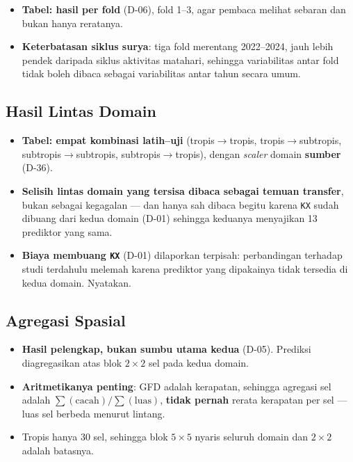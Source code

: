 \begin{itemize}
    \item \textbf{Tabel: hasil per fold} (D-06), fold 1--3, agar pembaca melihat
          sebaran dan bukan hanya reratanya.
    \item \textbf{Keterbatasan siklus surya}: tiga fold merentang 2022--2024,
          jauh lebih pendek daripada siklus aktivitas matahari, sehingga
          variabilitas antar fold tidak boleh dibaca sebagai variabilitas
          antar tahun secara umum.
\end{itemize}

\subsection{Hasil Lintas Domain}

\begin{itemize}
    \item \textbf{Tabel: empat kombinasi latih--uji} (tropis$\rightarrow$tropis,
          tropis$\rightarrow$subtropis, subtropis$\rightarrow$subtropis,
          subtropis$\rightarrow$tropis), dengan \textit{scaler} domain
          \textbf{sumber} (D-36).
    \item \textbf{Selisih lintas domain yang tersisa dibaca sebagai temuan
          transfer}, bukan sebagai kegagalan --- dan hanya sah dibaca begitu
          karena \texttt{KX} sudah dibuang dari kedua domain (D-01) sehingga
          keduanya menyajikan 13 prediktor yang sama.
    \item \textbf{Biaya membuang \texttt{KX}} (D-01) dilaporkan terpisah:
          perbandingan terhadap studi terdahulu melemah karena prediktor yang
          dipakainya tidak tersedia di kedua domain. Nyatakan.
\end{itemize}

\subsection{Agregasi Spasial}

\begin{itemize}
    \item \textbf{Hasil pelengkap, bukan sumbu utama kedua} (D-05). Prediksi
          diagregasikan atas blok $2\times2$ sel pada kedua domain.
    \item \textbf{Aritmetikanya penting}: GFD adalah kerapatan, sehingga
          agregasi sel adalah $\sum(\text{cacah}) / \sum(\text{luas})$,
          \textbf{tidak pernah} rerata kerapatan per sel --- luas sel berbeda
          menurut lintang.
    \item Tropis hanya 30 sel, sehingga blok $5\times5$ nyaris seluruh domain
          dan $2\times2$ adalah batasnya.
\end{itemize}

